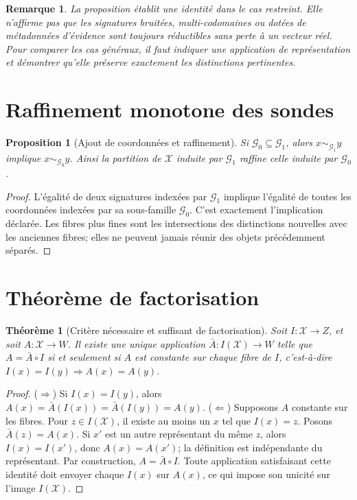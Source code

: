 \documentclass[11pt,a4paper,oneside]{report}
\newtheorem{proposition}{Proposition}[chapter]
\newtheorem{theorem}{Théorème}[chapter]
\newtheorem{remark}{Remarque}[chapter]
\newcommand{\X}{\mathcal X}
\newcommand{\Gcal}{\mathcal G}
\begin{document}
\begin{remark}
La proposition établit une identité dans le cas restreint. Elle n'affirme pas que les signatures bruitées, multi-codomaines ou dotées de métadonnées d'évidence sont toujours réductibles sans perte à un vecteur réel. Pour comparer les cas généraux, il faut indiquer une application de représentation et démontrer qu'elle préserve exactement les distinctions pertinentes.
\end{remark}

\section{Raffinement monotone des sondes}
\begin{proposition}[Ajout de coordonnées et raffinement]
Si \(\Gcal_0\subseteq\Gcal_1\), alors \(x\sim_{\Gcal_1}y\) implique \(x\sim_{\Gcal_0}y\). Ainsi la partition de \(\X\) induite par \(\Gcal_1\) raffine celle induite par \(\Gcal_0\).
\end{proposition}
\begin{proof}
L'égalité de deux signatures indexées par \(\Gcal_1\) implique l'égalité de toutes les coordonnées indexées par sa sous-famille \(\Gcal_0\). C'est exactement l'implication déclarée. Les fibres plus fines sont les intersections des distinctions nouvelles avec les anciennes fibres; elles ne peuvent jamais réunir des objets précédemment séparés.\end{proof}

\section{Théorème de factorisation}
\begin{theorem}[Critère nécessaire et suffisant de factorisation]
Soit \(I:\X\to Z\), et soit \(A:\X\to W\). Il existe une unique application \(\bar A:I(\X)\to W\) telle que \(A=\bar A\circ I\) si et seulement si \(A\) est constante sur chaque fibre de \(I\), c'est-à-dire \(I(x)=I(y)\Rightarrow A(x)=A(y)\).
\end{theorem}
\begin{proof}
(\(\Rightarrow\)) Si \(I(x)=I(y)\), alors \(A(x)=\bar A(I(x))=\bar A(I(y))=A(y)\). (\(\Leftarrow\)) Supposons \(A\) constante sur les fibres. Pour \(z\in I(\X)\), il existe au moins un \(x\) tel que \(I(x)=z\). Posons \(\bar A(z)=A(x)\). Si \(x'\) est un autre représentant du même \(z\), alors \(I(x)=I(x')\), donc \(A(x)=A(x')\); la définition est indépendante du représentant. Par construction, \(A=\bar A\circ I\). Toute application satisfaisant cette identité doit envoyer chaque \(I(x)\) sur \(A(x)\), ce qui impose son unicité sur l'image \(I(\X)\).\end{proof}
\end{document}
